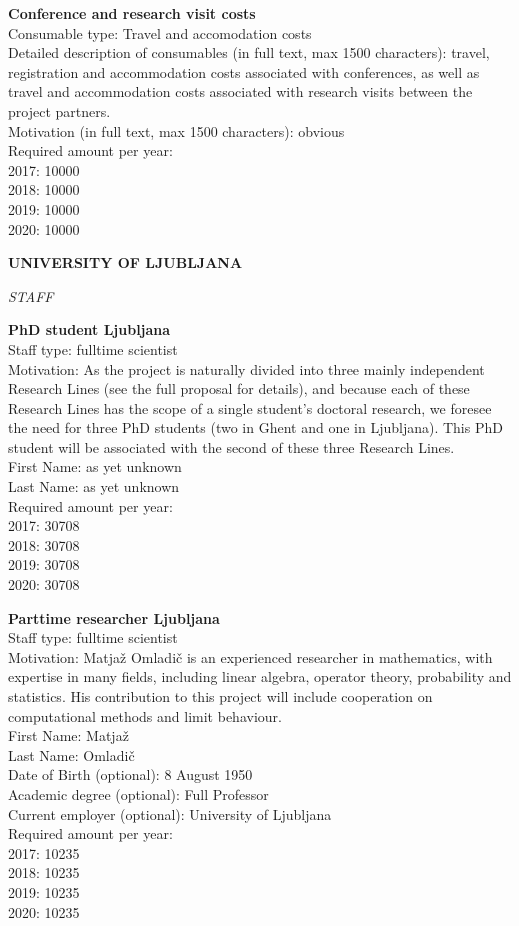 \documentclass[11pt,dvipsnames,usenames,a4paper]{article}
\begin{document}
{\bf Conference and research visit costs}\\
Consumable type: Travel and accomodation costs\\
Detailed description of consumables (in full text, max 1500 characters): travel, registration and accommodation costs associated with conferences, as well as travel and accommodation costs associated with research visits between the project partners.\\
Motivation (in full text, max 1500 characters): obvious\\
Required amount per year:\\
2017: 10000\\
2018: 10000\\
2019: 10000\\
2020: 10000


{\bf UNIVERSITY OF LJUBLJANA}

{\it STAFF}

\textbf{PhD student Ljubljana} \\
Staff type: fulltime scientist\\
Motivation: As the project is naturally divided into three mainly independent Research Lines (see the full proposal for details), and because each of these Research Lines has the scope of a single student's doctoral research, we foresee the need for three PhD students (two in Ghent and one in Ljubljana). This PhD student will be associated with the second of these three Research Lines.\\
First Name: as yet unknown\\
Last Name: as yet unknown\\
Required amount per year:\\
2017: 30708\\
2018: 30708\\
2019: 30708\\
2020: 30708

\textbf{Parttime researcher Ljubljana}\\
Staff type: fulltime scientist\\
Motivation: Matja\v{z} Omladi\v{c} is an experienced researcher in mathematics, with expertise in many fields, including linear algebra, operator theory, probability and statistics. His contribution to this project will include cooperation on computational methods and limit behaviour.\\
First Name: Matja\v{z}\\
Last Name: Omladi\v{c}\\
Date of Birth (optional): 8 August 1950\\
Academic degree (optional): Full Professor\\
Current employer (optional): University of Ljubljana\\
Required amount per year:\\
2017: 10235\\
2018: 10235\\
2019: 10235\\
2020: 10235
\end{document}
